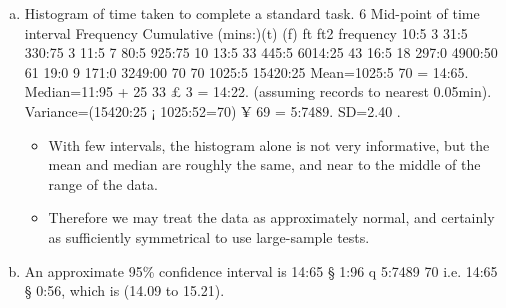 \documentclass[a4paper,12pt]{article}
\begin{document}
\begin{enumerate}[(a)]


\item Histogram of time taken to complete a standard task.
6
Mid-point of
time interval Frequency Cumulative
(mins:)(t) (f) ft ft2 frequency
10:5 3 31:5 330:75 3
11:5 7 80:5 925:75 10
13:5 33 445:5 6014:25 43
16:5 18 297:0 4900:50 61
19:0 9 171:0 3249:00 70
70 1025:5 15420:25
Mean=1025:5
70 = 14:65.
Median=11:95 + 25
33 £ 3 = 14:22.
(assuming records to nearest 0.05min).
Variance=(15420:25 ¡ 1025:52=70) ¥ 69 = 5:7489. SD=2.40 .
\begin{itemize}
    \item With few intervals, the histogram alone is not very informative, but the mean and median are
roughly the same, and near to the middle of the range of the data. \item Therefore we may treat the
data as approximately normal, and certainly as sufficiently symmetrical to use large-sample tests.
\end{itemize}
\item An approximate 95\% confidence interval is 14:65 § 1:96
q
5:7489
70 i.e. 14:65 § 0:56, which is
(14.09 to 15.21).
\end{enumerate}
\end{document}
